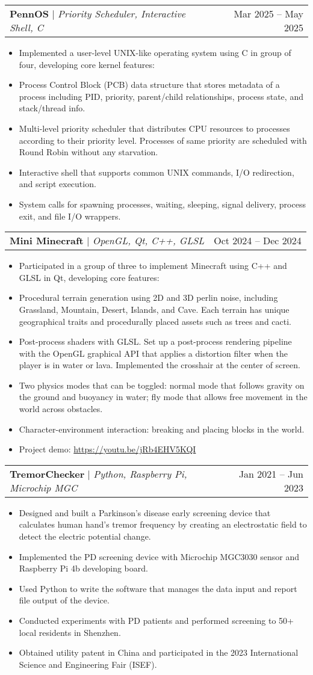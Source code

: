 \documentclass[letterpaper,11pt]{article}
\makeatletter
\newcommand{\resumeItem}[1]{
  \item\small{
    {#1 \vspace{-3pt}}
  }
}
\newcommand{\resumeProjectHeading}[2]{
    \item
    \begin{tabular*}{0.97\textwidth}{l@{\extracolsep{\fill}}r}
      \small#1 & #2 \\
    \end{tabular*}\vspace{-7pt}
}
\newcommand{\resumeItemListStart}{\begin{itemize}}
\newcommand{\resumeItemListEnd}{\end{itemize}\vspace{-5pt}}
\makeatother
\begin{document}
    \resumeProjectHeading
          {\textbf{PennOS} $|$ \emph{Priority Scheduler, Interactive Shell, C}}{Mar 2025 -- May 2025}
          \resumeItemListStart
            \resumeItem{Implemented a user-level UNIX-like operating system using C in group of four, developing core kernel features:}
            \resumeItem{Process Control Block (PCB) data structure that stores metadata of a process including PID, priority, parent/child relationships, process state, and stack/thread info.}
            \resumeItem{Multi-level priority scheduler that distributes CPU resources to processes according to their priority level. Processes of same priority are scheduled with Round Robin without any starvation.}
            \resumeItem{Interactive shell that supports common UNIX commands, I/O redirection, and script execution.}
            \resumeItem{System calls for spawning processes, waiting, sleeping, signal delivery, process exit, and file I/O wrappers.}
          \resumeItemListEnd
          
    \resumeProjectHeading
          {\textbf{Mini Minecraft} $|$ \emph{OpenGL, Qt, C++, GLSL}}{Oct 2024 -- Dec 2024}
          \resumeItemListStart
            \resumeItem{Participated in a group of three to implement Minecraft using C++ and GLSL in Qt, developing core features:}
            \resumeItem{Procedural terrain generation using 2D and 3D perlin noise, including Grassland, Mountain, Desert, Islands, and Cave. Each terrain has unique geographical traits and procedurally placed assets such as trees and cacti.}
            \resumeItem{Post-process shaders with GLSL. Set up a post-process rendering pipeline with the OpenGL graphical API that applies a distortion filter when the player is in water or lava. Implemented the crosshair at the center of screen.}
            \resumeItem{Two physics modes that can be toggled: normal mode that follows gravity on the ground and buoyancy in water; fly mode that allows free movement in the world across obstacles.}
            \resumeItem{Character-environment interaction: breaking and placing blocks in the world.}
            \resumeItem{Project demo: \url{https://youtu.be/jRb4EHV5KQI}}
          \resumeItemListEnd
          
    \resumeProjectHeading
          {\textbf{TremorChecker} $|$ \emph{Python, Raspberry Pi, Microchip MGC}}{Jan 2021 -- Jun 2023}
          \resumeItemListStart
            \resumeItem{Designed and built a Parkinson’s disease early screening device that calculates human hand’s tremor frequency by creating an electrostatic field to detect the electric potential change.}
            \resumeItem{Implemented the PD screening device with Microchip MGC3030 sensor and Raspberry Pi 4b developing board.}
            \resumeItem{Used Python to write the software that manages the data input and report file output of the device.}
            \resumeItem{Conducted experiments with PD patients and performed screening to 50+ local residents in Shenzhen.}
            \resumeItem{Obtained utility patent in China and participated in the 2023 International Science and Engineering Fair (ISEF).}
          \resumeItemListEnd
          
\end{document}
